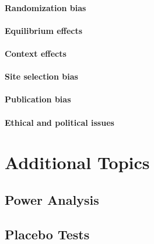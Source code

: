 \documentclass[]{book}
\theoremstyle{definition}
\theoremstyle{definition}
\theoremstyle{definition}
\theoremstyle{remark}
\begin{document}
\hypertarget{randomization-bias}{%
\subsection{Randomization bias}\label{randomization-bias}}

\hypertarget{equilibrium-effects}{%
\subsection{Equilibrium effects}\label{equilibrium-effects}}

\hypertarget{context-effects}{%
\subsection{Context effects}\label{context-effects}}

\hypertarget{site-selection-bias}{%
\subsection{Site selection bias}\label{site-selection-bias}}

\hypertarget{publication-bias}{%
\subsection{Publication bias}\label{publication-bias}}

\hypertarget{ethical-and-political-issues}{%
\subsection{Ethical and political issues}\label{ethical-and-political-issues}}

\hypertarget{part-additional-topics}{%
\part{Additional Topics}\label{part-additional-topics}}

\hypertarget{Power}{%
\chapter{Power Analysis}\label{Power}}

\hypertarget{Placebo}{%
\chapter{Placebo Tests}\label{Placebo}}
\end{document}
